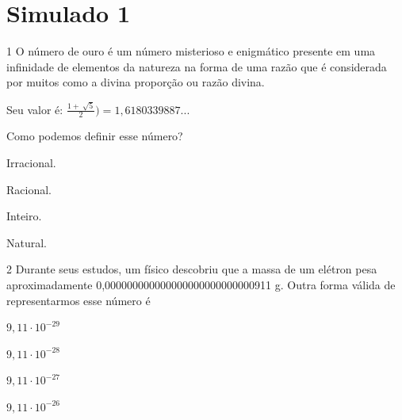 


\mbox{}



\pagebreak

\section*{Simulado 1}

\num{1} O número de ouro é um número misterioso e enigmático presente em uma
infinidade de elementos da natureza na forma de uma razão que é
considerada por muitos como a divina proporção ou razão divina.

Seu valor é: $\frac{1 + \ \sqrt{5}}{2}) = 1,6180339887...$

Como podemos definir esse número?

\begin{escolha}
\item Irracional.
\item Racional.
\item Inteiro.
\item Natural.
\end{escolha}






\num{2} Durante seus estudos, um físico descobriu que a massa de um elétron
pesa aproximadamente 0,000000000000000000000000000911 g. Outra forma
válida de representarmos esse número é

\begin{escolha}
\item $9,11 \cdot 10^{-29}$
\item $9,11 \cdot 10^{-28}$
\item $9,11 \cdot 10^{-27}$
\item $9,11 \cdot 10^{-26}$
\end{escolha}

